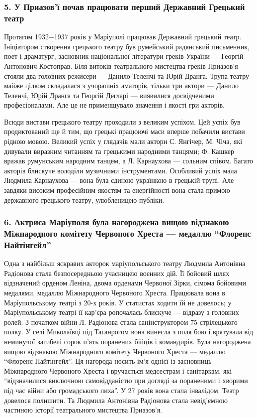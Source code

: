\subsubsection{5. У Приазов'ї почав працювати перший Державний Грецький театр}

Протягом 1932−1937 років у Маріуполі працював Державний грецький театр.
Ініціатором створення грецького театру був румейський радянський письменник,
поет і драматург, засновник національної літератури греків України — Георгій
Антонович Костоправ. Біля витоків театрального мистецтва греків Приазов'я
стояли два головних режисери — Данило Теленчі та Юрій Дранга. Трупа театру
майже цілком складалася з учорашніх аматорів, тільки три актори — Данило
Теленчі, Юрій Дранга та Георгій Дегларі — виявилися досвідченими
професіоналами. Але це не применшувало значення і якості гри акторів.


Всюди вистави грецького театру проходили з великим успіхом. Цей успіх був
продиктований ще й тим, що грецькі працюючі маси вперше побачили вистави рідною
мовою. Великий успіх у глядачів мали актори С. Янгічер, М. Чіча, які дивували
виразним читанням та грецькими народними танцями; Ф. Кашкер вражав румунським
народним танцем, а Л. Карнаухова — сольним співом. Багато акторів блискуче
володіли музичними інструментами. Особливий успіх мала Людмила Карнаухова —
вона була єдиною українкою в грецькій трупі. Але завдяки високим професійним
якостям та енергійності вона стала примою державного грецького театру,
улюбленицею публіки.

\subsubsection{6. Актриса Маріуполя була нагороджена вищою відзнакою Міжнародного комітету Червоного Хреста — медаллю \enquote{Флоренс Найтінгейл}}

Одна з найбільш яскравих акторок маріупольського театру Людмила Антонівна
Радіонова стала безпосередньою учасницею воєнних дій. Її бойовий шлях
відзначений орденом Леніна, двома орденами Червоної Зірки, сімома бойовими
медалями, медаллю Міжнародного Червоного Хреста. Працювала вона в
Маріупольському театрі з 20-х років. У статистах ходити їй не довелось; у
Маріупольському театрі її кар'єра ропочалась блискуче — відразу з головних
ролей. З початком війни Л. Радіонова стала санінструктором 75-стрілецького
полку. У селі Миколаївці під Таганрогом вона винесла з поля бою і врятувала від
неминучої загибелі сорок п'ять поранених бійців і командирів. Була нагороджена
вищою відзнакою Міжнародного комітету Червоного Хреста — медаллю \enquote{Флоренс
Найтінгейл}. Ця нагорода носить ім'я однієї із засновниць Міжнародного
Червоного Хреста і вручається медсестрам і санітаркам, які \enquote{відзначилися
виключною самовідданістю при догляді за пораненими і хворими під час війни або
громадського лиха}. У 27 років вона стала інвалідом. Театр довелося полишити.
Та Людмила Антонівна Радіонова стала невід'ємною частиною історії театрального
мистецтва Приазов'я.

